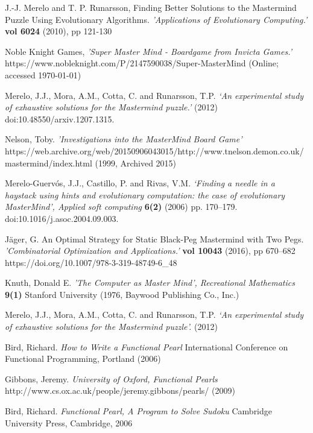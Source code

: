 \documentclass[11pt]{article}  %
\theoremstyle{definition}
\theoremstyle{remark}
\begin{document}
\begin{thebibliography}{99}
J.-J. Merelo and T. P. Runarsson,
Finding Better Solutions to the Mastermind Puzzle Using Evolutionary Algorithms.
{\em 'Applications of Evolutionary Computing.'}
{\bf vol 6024}
(2010), pp 121-130

Noble Knight Games,
{\em 'Super Master Mind - Boardgame from Invicta Games.'}
https://www.nobleknight.com/P/2147590038/Super-MasterMind
(Online; accessed \today)

Merelo, J.J., Mora, A.M., Cotta, C. and Runarsson, T.P. 
{\em  ‘An experimental study of exhaustive solutions for the Mastermind puzzle.'}
(2012)
 doi:10.48550/arxiv.1207.1315.

Nelson, Toby.
{\em 'Investigations into the MasterMind Board Game'}
https://web.archive.org/web/20150906043015/http://www.tnelson.demon.co.uk/mastermind/index.html
(1999, Archived 2015)

Merelo-Guervós, J.J., Castillo, P. and Rivas, V.M. 
{\em ‘Finding a needle in a haystack using hints and evolutionary computation: the case of evolutionary MasterMind’, Applied soft computing}
{\bf  6(2)}
(2006) pp. 170–179. 
doi:10.1016/j.asoc.2004.09.003.

Jäger, G.
An Optimal Strategy for Static Black-Peg Mastermind with Two Pegs.
{\em 'Combinatorial Optimization and Applications.'}
{\bf vol 10043}
(2016), pp 670–682
https://doi.org/10.1007/978-3-319-48749-6\_48

Knuth, Donald E. 
{\em 'The Computer as Master Mind', Recreational Mathematics}
{\bf 9(1)}
Stanford University
(1976, Baywood Publishing Co., Inc.)

 Merelo, J.J., Mora, A.M., Cotta, C. and Runarsson, T.P. 
{\em ‘An experimental study of exhaustive solutions for the Mastermind puzzle’.}
(2012) 

Bird, Richard.
{\em How to Write a Functional Pearl}
International Conference on Functional Programming, Portland
(2006)

Gibbons, Jeremy.
{\em University of Oxford, Functional Pearls}
http://www.cs.ox.ac.uk/people/jeremy.gibbons/pearls/
(2009)

Bird, Richard.
{\em Functional Pearl, A Program to Solve Sudoku}
Cambridge University Press, Cambridge, 2006

\end{thebibliography}
\end{document}
